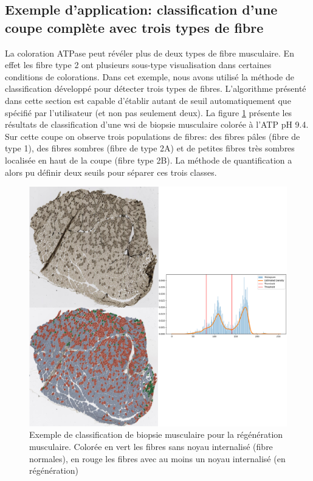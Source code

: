 \subsection{Exemple d'application: classification d'une coupe complète avec trois types de fibre}
La coloration ATPase peut révéler plus de deux types de fibre musculaire. En effet les fibre type 2 ont plusieurs sous-type visualisation dans certaines conditions de colorations. Dans cet exemple, nous avons utilisé la méthode de classification développé pour détecter trois types de fibres. L'algorithme présenté dans cette section est capable d'établir autant de seuil automatiquement que spécifié par l'utilisateur (et non pas seulement deux). La figure \ref{fig:atp_paint_wsi} présente les résultats de classification d'une \gls{wsi} de biopsie musculaire colorée à l'ATP pH 9.4. Sur cette coupe on observe trois populations de fibres: des fibres pâles (fibre de type 1), des fibres sombres (fibre de type 2A) et de petites fibres très sombres localisée en haut de la coupe (fibre type 2B). La méthode de quantification a alors pu définir deux seuils pour séparer ces trois classes. 
\begin{figure}[htbp]
 \centering
 \includegraphics[width=1\textwidth]{figures/atp_wsi.png}
 \caption[Exemple de classification de biopsie musculaire pour la régénération musculaire]{Exemple de classification de biopsie musculaire pour la régénération musculaire. Colorée en vert les fibres sans noyau internalisé (fibre normales), en rouge les fibres avec au moins un noyau internalisé (en régénération)}
 \label{fig:atp_paint_wsi}
\end{figure}

